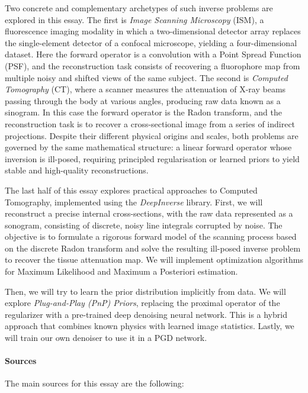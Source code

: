 Two concrete and complementary archetypes of such inverse problems are explored in this essay. The first is \textit{Image Scanning Microscopy} (ISM), a fluorescence imaging modality in which a two-dimensional detector array replaces the single-element detector of a confocal microscope, yielding a four-dimensional dataset. Here the forward operator is a convolution with a Point Spread Function (PSF), and the reconstruction task consists of recovering a fluorophore map from multiple noisy and shifted views of the same subject. The second is \textit{Computed Tomography} (CT), where a scanner measures the attenuation of X-ray beams passing through the body at various angles, producing raw data known as a sinogram. In this case the forward operator is the Radon transform, and the reconstruction task is to recover a cross-sectional image from a series of indirect projections. Despite their different physical origins and scales, both problems are governed by the same mathematical structure: a linear forward operator whose inversion is ill-posed, requiring principled regularisation or learned priors to yield stable and high-quality reconstructions.

The last half of this essay explores practical approaches to Computed Tomography, implemented using the \textit{DeepInverse} library. First, we will reconstruct a precise internal cross-sections, with the raw data represented as a sonogram, consisting of discrete, noisy line integrals corrupted by noise.  The objective is to formulate a rigorous forward model of the scanning process based on the discrete Radon transform and solve the resulting ill-posed inverse problem to recover the tissue attenuation map. We will implement optimization algorithms for Maximum Likelihood and Maximum a Posteriori estimation.

Then, we will try to learn the prior distribution implicitly from data. We will explore \textit{Plug-and-Play (PnP) Priors}, replacing the proximal operator of the regularizer with a pre-trained deep denoising neural network. This is a hybrid approach that combines known physics with learned image statistics. Lastly, we will train our own denoiser to use it in a PGD network.

\paragraph{Sources}

The main sources for this essay are the following:

